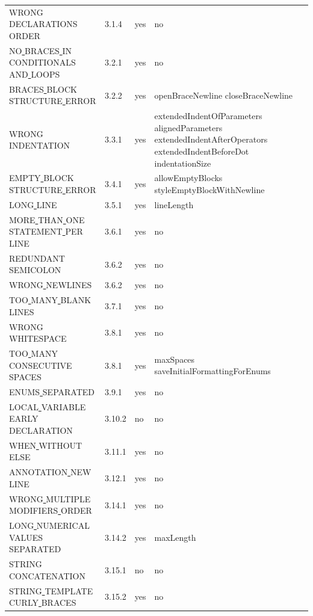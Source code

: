 \begin{longtable}{ |l|p{0.8cm}|p{0.8cm}| p{3cm} | }
WRONG\underline{ }DECLARATIONS\underline{ }ORDER & 3.1.4 &  yes  &   no  \\
NO\underline{ }BRACES\underline{ }IN\underline{ }CONDITIONALS\underline{ }AND\underline{ }LOOPS & 3.2.1 &  yes  &   no  \\
BRACES\underline{ }BLOCK\underline{ }STRUCTURE\underline{ }ERROR & 3.2.2 &  yes  &   openBraceNewline closeBraceNewline  \\
WRONG\underline{ }INDENTATION & 3.3.1 &  yes  &  extendedIndentOfParameters alignedParameters extendedIndentAfterOperators extendedIndentBeforeDot indentationSize   \\
EMPTY\underline{ }BLOCK\underline{ }STRUCTURE\underline{ }ERROR & 3.4.1 &  yes  &   allowEmptyBlocks styleEmptyBlockWithNewline  \\
LONG\underline{ }LINE & 3.5.1 &  yes  &   lineLength                 \\
MORE\underline{ }THAN\underline{ }ONE\underline{ }STATEMENT\underline{ }PER\underline{ }LINE & 3.6.1 &  yes  &   no  \\
REDUNDANT\underline{ }SEMICOLON & 3.6.2 &  yes  &   no  \\
WRONG\underline{ }NEWLINES & 3.6.2 &  yes  &   no  \\
TOO\underline{ }MANY\underline{ }BLANK\underline{ }LINES & 3.7.1 &  yes  &   no  \\
WRONG\underline{ }WHITESPACE & 3.8.1 &  yes  &   no  \\
TOO\underline{ }MANY\underline{ }CONSECUTIVE\underline{ }SPACES & 3.8.1 &  yes  &   maxSpaces saveInitialFormattingForEnums  \\
ENUMS\underline{ }SEPARATED & 3.9.1 &  yes  &   no  \\
LOCAL\underline{ }VARIABLE\underline{ }EARLY\underline{ }DECLARATION & 3.10.2 &  no  &   no  \\
WHEN\underline{ }WITHOUT\underline{ }ELSE & 3.11.1 &  yes  &   no  \\
ANNOTATION\underline{ }NEW\underline{ }LINE & 3.12.1 &  yes  &   no  \\
WRONG\underline{ }MULTIPLE\underline{ }MODIFIERS\underline{ }ORDER & 3.14.1 &  yes  &   no  \\
LONG\underline{ }NUMERICAL\underline{ }VALUES\underline{ }SEPARATED & 3.14.2 &  yes  &   maxLength                  \\
STRING\underline{ }CONCATENATION & 3.15.1 &  no  &   no  \\
STRING\underline{ }TEMPLATE\underline{ }CURLY\underline{ }BRACES & 3.15.2 &  yes  &   no  \\

\end{longtable}
